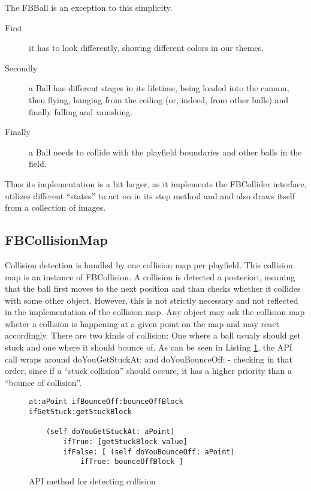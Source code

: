 The FBBall is an exception to this simplicity. 
\begin{description}
  \item[First]
    	it has to look 
	differently, showing different colors in our themes. 
  \item[Secondly]
    	a Ball has different stages in its lifetime, being 
	loaded into the cannon, then flying, hanging from the 
	ceiling (or, indeed, from other balls) and finally falling 
	and vanishing.
  \item[Finally]
    	a Ball needs to collide with the playfield boundaries and 
	other balls in the field.
\end{description}
Thus its implementation is a bit larger, as it implements the FBCollider 
interface, utilizes different ``states'' to act on in its step method and 
and also draws itself from a collection of images.
%
\subsection{FBCollisionMap}
Collision detection is handled by one collision map per playfield. This collision
map is an instance of FBCollision. A collision is detected a posteriori, meaning
that the ball first moves to the next position and  than checks whether it collides
with some other object. However, this is not strictly necessary and not reflected in
the implementation of the collision map. Any object may ask the collision map wheter
a collision is happening at a given point on the map and may react accordingly. There
are two kinds of collision: One where a ball usualy should get stuck and one where it
should bounce of. As can be seen in Listing \ref{lst:ifBounceOff}, the API call wraps
around doYouGetStuckAt: and doYouBounceOff: - checking in that order, since if a ``stuck
collision'' should occure, it has a higher priority than a ``bounce of collision''.

%
\begin{figure}
  \begin{center}
    \begin{lstlisting}
at:aPoint ifBounceOff:bounceOffBlock ifGetStuck:getStuckBlock
	
	(self doYouGetStuckAt: aPoint)
		ifTrue: [getStuckBlock value]
		ifFalse: [ (self doYouBounceOff: aPoint)
			ifTrue: bounceOffBlock ]
    \end{lstlisting}
  \end{center}
  \caption{API method for detecting collision}
  \label{lst:ifBounceOff}
\end{figure}